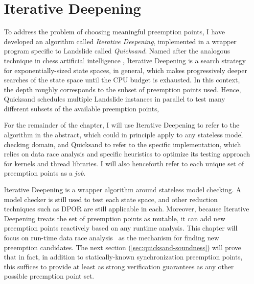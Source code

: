 \section{Iterative Deepening}
\label{sec:quicksand-id}

To address the problem of choosing meaningful preemption points,
I have developed an algorithm called {\em Iterative Deepening},
implemented in a wrapper program specific to Landslide called {\em Quicksand}.
Named after the analogous technique in chess artificial intelligence \cite{iterative-deepening-chess-ai},
Iterative Deepening
is a search strategy
for exponentially-sized state spaces, in general,
which
makes progressively deeper searches of the state space until the CPU budget is exhausted.
In this context, the depth roughly corresponds to the subset of preemption points used.
Hence, Quicksand
schedules multiple Landslide instances in parallel to
test many different subsets of the available preemption points,

For the remainder of the chapter, I will use Iterative Deepening to refer to the algorithm in the abstract,
which could in principle apply to any stateless model checking domain,
and Quicksand to refer to the specific implementation,
which relies on data race analysis and specific heuristics to optimize its testing approach
for kernels and thread libraries.
I will also henceforth refer to each unique set of preemption points as a {\em job}.



Iterative Deepening is a wrapper algorithm around stateless model checking.
A model checker is still used to test each state space, and other reduction techniques such as DPOR
are still applicable in each.
Moreover, because Iterative Deepening treats the set of preemption points as mutable,
it can add new preemption points reactively based on any runtime analysis.
This chapter
will focus on run-time data race analysis~\cite{tsan,fasttrack} as the mechanism for finding new preemption candidates.
The next section (\cref{sec:quicksand-soundness})
will prove that in fact,
in addition to statically-known synchronization preemption points,
this suffices to provide at least as strong verification guarantees as any other possible preemption point set.

